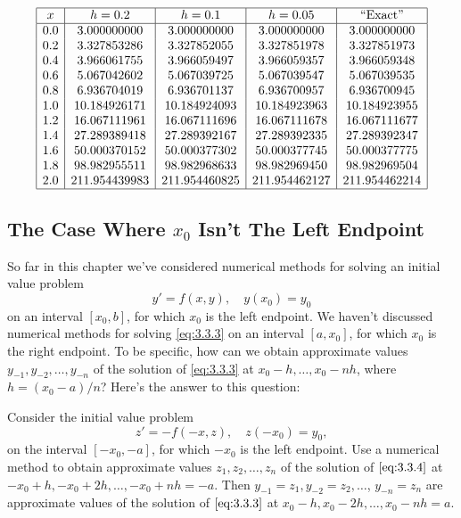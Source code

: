 \documentclass{ximera}
\begin{document}
\begin{example}
$$
\begin{array}{|c|c|c|c|c|}
\hline
x&
h=0.2&
h=0.1&
h=0.05&
\text{``Exact''}\\ \hline
0.0 &   3.000000000 &   3.000000000 &   3.000000000 &   3.000000000 \\
0.2 &   3.327853286 &   3.327852055 &   3.327851978 &   3.327851973 \\
0.4 &   3.966061755 &   3.966059497 &   3.966059357 &   3.966059348 \\
0.6 &   5.067042602 &   5.067039725 &   5.067039547 &   5.067039535 \\
0.8 &   6.936704019 &   6.936701137 &   6.936700957 &   6.936700945 \\
1.0 &  10.184926171 &  10.184924093 &  10.184923963 &  10.184923955 \\
1.2 &  16.067111961 &  16.067111696 &  16.067111678 &  16.067111677 \\
1.4 &  27.289389418 &  27.289392167 &  27.289392335 &  27.289392347 \\
1.6 &  50.000370152 &  50.000377302 &  50.000377745 &  50.000377775 \\
1.8 &  98.982955511 &  98.982968633 &  98.982969450 &  98.982969504 \\
2.0 & 211.954439983 & 211.954460825 & 211.954462127 & 211.954462214 \\
\hline
\end{array}
$$
\end{example}


\subsection*{The Case Where $x_0$ Isn't  The Left Endpoint}

So far in this chapter we've considered numerical methods
 for solving an initial value problem
\begin{equation} \label{eq:3.3.3}
y'=f(x,y),\quad y(x_0)=y_0
\end{equation}
on an interval $[x_0,b]$, for which $x_0$ is the left endpoint. We
haven't discussed numerical methods for solving \eqref{eq:3.3.3}
on an interval $[a,x_0]$, for which $x_0$ is the
right endpoint. To be specific, how can we obtain approximate values
$y_{-1}, y_{-2}, \dots, y_{-n}$ of the solution of \eqref{eq:3.3.3} at
$x_0-h, \dots,x_0-nh$,
where $h=(x_0-a)/n$?  Here's the answer to this question:

 Consider the initial value problem
\begin{equation} \label{eq:3.3.4}
z'=-f(-x,z),\quad z(-x_0)=y_0,
\end{equation}
on the interval $[-x_0,-a]$, for which $-x_0$ is the left endpoint.
Use a numerical method to obtain approximate values
$z_1, z_2, \dots, z_n$ of the solution of $\eqref{eq:3.3.4}$ at
$-x_0+h, -x_0+2h, \dots, -x_0+nh=-a$. Then
$y_{-1}=z_1, y_{-2}=z_2, \dots$, $y_{-n}=z_n$
are approximate values of the solution of $\eqref{eq:3.3.3}$ at
$x_0-h, x_0-2h, \dots, x_0-nh=a$.
\end{document}
